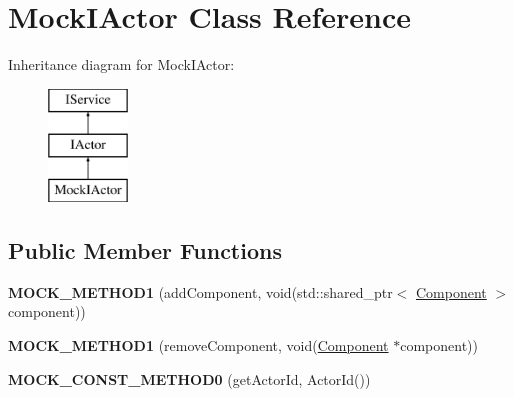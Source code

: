 \hypertarget{classMockIActor}{}\section{Mock\+I\+Actor Class Reference}
\label{classMockIActor}
Inheritance diagram for Mock\+I\+Actor\+:\begin{figure}[H]
\begin{center}
\leavevmode
\includegraphics[height=3.000000cm]{classMockIActor}
\end{center}
\end{figure}
\subsection*{Public Member Functions}
\begin{DoxyCompactItemize}
\item 
{\bfseries M\+O\+C\+K\+\_\+\+M\+E\+T\+H\+O\+D1} (add\+Component, void(std\+::shared\+\_\+ptr$<$ \hyperlink{classComponent}{Component} $>$ component))\hypertarget{classMockIActor_afd4a3ea1a2d1fa415027cbc8c5fc4939}{}\label{classMockIActor_afd4a3ea1a2d1fa415027cbc8c5fc4939}

\item 
{\bfseries M\+O\+C\+K\+\_\+\+M\+E\+T\+H\+O\+D1} (remove\+Component, void(\hyperlink{classComponent}{Component} $\ast$component))\hypertarget{classMockIActor_ae1cb886aa8c8f30972a4cf8fc6dda431}{}\label{classMockIActor_ae1cb886aa8c8f30972a4cf8fc6dda431}

\item 
{\bfseries M\+O\+C\+K\+\_\+\+C\+O\+N\+S\+T\+\_\+\+M\+E\+T\+H\+O\+D0} (get\+Actor\+Id, Actor\+Id())\hypertarget{classMockIActor_ad9ae3f4c57ca925f2e2a74b2d97b2db3}{}\label{classMockIActor_ad9ae3f4c57ca925f2e2a74b2d97b2db3}

\end{DoxyCompactItemize}
